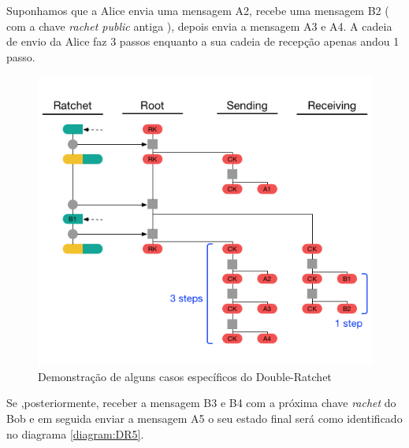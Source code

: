 Suponhamos que a Alice envia uma mensagem A2, recebe uma mensagem B2 ( com a chave \textit{rachet public} antiga ), depois envia a mensagem A3 e A4. A cadeia de envio da Alice faz 3 passos enquanto a sua cadeia de recepção apenas andou 1 passo.

\begin{figure}[H]
\begin{center}
\includegraphics[width=12cm]{img/DR4.png}
\caption{Demonstração de alguns casos específicos do Double-Ratchet}
\label{diagram:DR4} 
\centering
\end{center}
\end{figure}

Se ,posteriormente, receber a mensagem B3 e B4 com a próxima chave \textit{rachet} do Bob e em seguida enviar a mensagem A5 o seu estado final será como identificado no diagrama \ref{diagram:DR5}.


